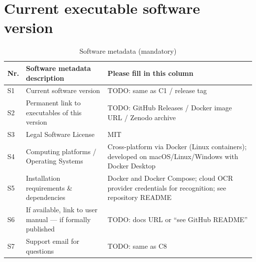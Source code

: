 \documentclass[preprint,12pt,a4paper]{elsarticle}
\begin{document}




\section*{Current executable software version}
\label{sec:executable-version}


\begin{table}[!h]
\begin{tabular}{|l|p{6.5cm}|p{6.5cm}|}
\hline
\textbf{Nr.} & \textbf{Software metadata description} & \textbf{Please fill in this column} \\
\hline
S1 & Current software version & TODO: same as C1 / release tag \\
\hline
S2 & Permanent link to executables of this version & TODO: GitHub Releases / Docker image URL / Zenodo archive \\
\hline
S3 & Legal Software License & MIT \\
\hline
S4 & Computing platforms / Operating Systems & Cross-platform via Docker (Linux containers); developed on macOS/Linux/Windows with Docker Desktop \\
\hline
S5 & Installation requirements \& dependencies & Docker and Docker Compose; cloud OCR provider credentials for recognition; see repository README \\
\hline
S6 & If available, link to user manual --- if formally published & TODO: docs URL or ``see GitHub README'' \\
\hline
S7 & Support email for questions & TODO: same as C8 \\
\hline
\end{tabular}
\caption{Software metadata (mandatory)}
\label{tab:software-metadata}
\end{table}
\end{document}
